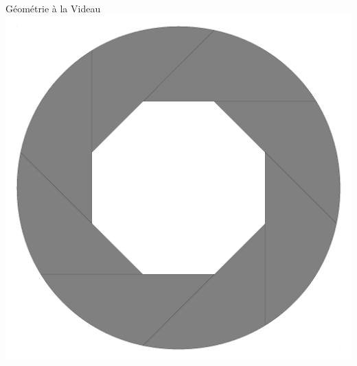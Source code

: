 \documentclass[8pt]{beamer}
\begin{document}
\begin{frame}
\begin{minipage}{0.43\linewidth}
\begin{center}
        ~ \\
        Géométrie à la Videau
        \includegraphics[width=0.8\linewidth]{VIDEAU-structure.pdf}
      \end{center}
    \end{minipage}
  \end{frame}
\end{document}
